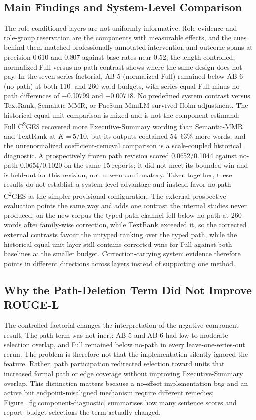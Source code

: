 \documentclass[information,article,submit,moreauthors]{Definitions/mdpi}
\newcommand{\cges}{C\textsuperscript{2}GES}
\begin{document}
\subsection{Main Findings and System-Level Comparison}

The role-conditioned layers are not uniformly informative. Role evidence and role-group reservation are the components with measurable effects, and the cues behind them matched professionally annotated intervention and outcome spans at precision 0.610 and 0.807 against base rates near 0.52; the length-controlled, normalized Full versus no-path contrast shows where the same design does not pay. In the seven-series factorial, AB-5 (normalized Full) remained below AB-6 (no-path) at both 110- and 260-word budgets, with series-equal Full-minus-no-path differences of $-0.00799$ and $-0.00718$. No predefined system contrast versus TextRank, Semantic-MMR, or PacSum-MiniLM survived Holm adjustment. The historical equal-unit comparison is mixed and is not the component estimand: Full \cges{} recovered more Executive-Summary wording than Semantic-MMR and TextRank at $K=5/10$, but its outputs contained 54--63\% more words, and the unrenormalized coefficient-removal comparison is a scale-coupled historical diagnostic. A prospectively frozen path revision scored 0.0652/0.1044 against no-path 0.0654/0.1020 on the same 15 reports; it did not meet its bounded win and is held-out for this revision, not unseen confirmatory. Taken together, these results do not establish a system-level advantage and instead favor no-path \cges{} as the simpler provisional configuration. The external prospective evaluation points the same way and adds one contrast the internal studies never produced: on the new corpus the typed path channel fell below no-path at 260 words after family-wise correction, while TextRank exceeded it, so the corrected external contrasts favour the untyped ranking over the typed path, while the historical equal-unit layer still contains corrected wins for Full against both baselines at the smaller budget. Correction-carrying system evidence therefore points in different directions across layers instead of supporting one method.

\subsection{Why the Path-Deletion Term Did Not Improve ROUGE-L}

The controlled factorial changes the interpretation of the negative component result. The path term was not inert: AB-5 and AB-6 had low-to-moderate selection overlap, and Full remained below no-path in every leave-one-series-out rerun. The problem is therefore not that the implementation silently ignored the feature. Rather, path participation redirected selection toward units that increased formal path or edge coverage without improving Executive-Summary overlap. This distinction matters because a no-effect implementation bug and an active but endpoint-misaligned mechanism require different remedies; Figure~\ref{fig:component-diagnostic} summarises how many sentence scores and report--budget selections the term actually changed.
\end{document}
